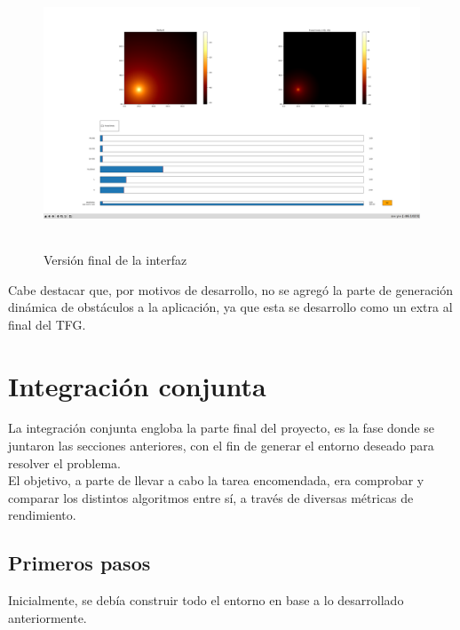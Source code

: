 \begin{figure} [H]
    \begin{center}
    \includegraphics[height=8cm]{imagenes/cap4/7_Friss_endGUI.png}
    \end{center}
	\caption[Versión final de la interfaz]{Versión final de la interfaz}
	\label{fig:friis_end_app}
\end{figure}

Cabe destacar que, por motivos de desarrollo, no se agregó la parte de generación dinámica de obstáculos a la aplicación, ya que esta se desarrollo como un extra al final del \ac{TFG}.\\

\newpage
\section{Integración conjunta}
\label{sec:integration}

La integración conjunta engloba la parte final del proyecto, es la fase donde se juntaron las secciones anteriores, con el fin de generar el entorno deseado para resolver el problema.\\

El objetivo, a parte de llevar a cabo la tarea encomendada, era comprobar y comparar los distintos algoritmos entre sí, a través de diversas métricas de rendimiento.\\

\subsection{Primeros pasos}
\label{subsec:primeros_pasos}

Inicialmente, se debía construir todo el entorno en base a lo desarrollado anteriormente.\\

